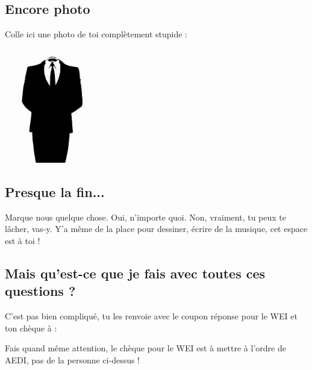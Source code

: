 \subsection*{Encore photo}
Colle ici une photo de toi complètement stupide :
\begin{center}
\includegraphics[height=5cm, angle=120]{images/anonymous.jpg}
\end{center}

\subsection*{Presque la fin...}
Marque nous quelque chose. Oui, n'importe quoi. Non, vraiment, tu peux te
lâcher, vas-y. Y'a même de la place pour dessiner, écrire de la musique, cet
espace est à toi !
\vspace{8cm}
\subsection{Mais qu'est-ce que je fais avec toutes ces questions ?}
C'est pas bien compliqué, tu les renvoie avec le coupon réponse pour le WEI et
ton chèque à :
\adresseCoupon



Fais quand même attention, le chèque pour le WEI est à mettre à l'ordre de AEDI, pas de la personne ci-dessus !
